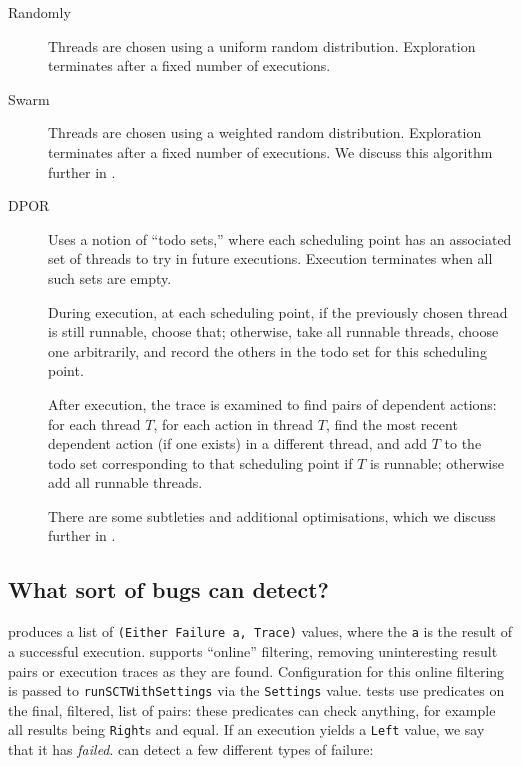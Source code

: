\begin{description}
\item[Randomly] Threads are chosen using a uniform random
  distribution.  Exploration terminates after a fixed number of
  executions.

\item[Swarm] Threads are chosen using a weighted random distribution.
  Exploration terminates after a fixed number of executions.  We
  discuss this algorithm further in .

\item[DPOR] Uses a notion of ``todo sets,'' where each
  scheduling point has an associated set of threads to try in future
  executions.  Execution terminates when all such sets are empty.

  During execution, at each scheduling point, if the previously chosen
  thread is still runnable, choose that; otherwise, take all runnable
  threads, choose one arbitrarily, and record the others in the todo
  set for this scheduling point.

  After execution, the trace is examined to find pairs of dependent
  actions: for each thread $T$, for each action in thread $T$, find
  the most recent dependent action (if one exists) in a different
  thread, and add $T$ to the todo set corresponding to that scheduling
  point if $T$ is runnable; otherwise add all runnable threads.

  There are some subtleties and additional optimisations, which we
  discuss further in .
\end{description}

\subsection{What sort of bugs can \dejafu{} detect?}
\dejafu{} produces a list of \verb|(Either Failure a, Trace)| values,
where the \verb|a| is the result of a successful execution.  \dejafu{}
supports ``online'' filtering, removing uninteresting result pairs or
execution traces as they are found.  Configuration for this online
filtering is passed to \verb|runSCTWithSettings| via the
\verb|Settings| value.  \dejafu{} tests use predicates on the final,
filtered, list of pairs: these predicates can check anything, for
example all results being \verb|Right|s and equal.  If an execution
yields a \verb|Left| value, we say that it has \emph{failed}.
\dejafu{} can detect a few different types of failure:

